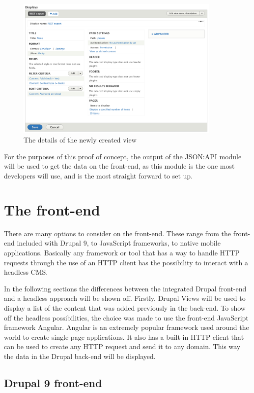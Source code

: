 \begin{figure}[h]
	\centering
	\includegraphics[width=10cm]{./img/View_Details.png}
	\caption[Details of a View]{The details of the newly created view}
\end{figure}

For the purposes of this proof of concept, the output of the JSON:API module will be used to get the data on the front-end, as this module is the one most developers will use, and is the most straight forward to set up.

\section{The front-end}

There are many options to consider on the front-end. These range from the front-end included with Drupal 9, to JavaScript frameworks, to native mobile applications. Basically any framework or tool that has a way to handle HTTP requests through the use of an HTTP client has the possibility to interact with a headless CMS. 

In the following sections the differences between the integrated Drupal front-end and a headless approach will be shown off. Firstly, Drupal Views will be used to display a list of the content that was added previously in the back-end. To show off the headless possibilities, the choice was made to use the front-end JavaScript framework Angular. Angular is an extremely popular framework used around the world to create single page applications. It also has a built-in HTTP client that can be used to create any HTTP request and send it to any domain. This way the data in the Drupal back-end will be displayed.

\subsection{Drupal 9 front-end}


